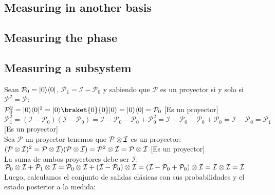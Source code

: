 \documentclass[osajnl,preprint,showpacs,superscriptaddress,10pt]{revtex4-1} %
\DeclarePairedDelimiter\bra{\langle}{\rvert}
\DeclarePairedDelimiter\ket{\lvert}{\rangle}
\begin{document}
\subsection{Measuring in another basis}

\subsection{Measuring the phase}

\subsection{Measuring a subsystem}

Sean $\mathcal{P}_0 = \ket{0}\bra{0}$, $\mathcal{P}_1 = \mathcal{I} - \mathcal{P}_0$ y sabiendo que $\mathcal{P}$ es un proyector si y solo si $\mathcal{P}^2 = \mathcal{P}$: \\

$\mathcal{P}^2_0 = \ket{0}\bra{0}^2 = \ket{0}\braket{0}{0}\ket{0} = \ket{0}\bra{0} = \mathcal{P}_0$ [Es un proyector] \\

$\mathcal{P}^2_1 = (\mathcal{I} - \mathcal{P}_0)(\mathcal{I} - \mathcal{P}_0) = \mathcal{I} - \mathcal{P}_0 - \mathcal{P}_0 + \mathcal{P}^2_0 = \mathcal{I} - \mathcal{P}_0 - \mathcal{P}_0 + \mathcal{P}_0 = \mathcal{I} - \mathcal{P}_0 = \mathcal{P}_1$ [Es un proyector] \\

Sea $\mathcal{P}$ un proyector tenemos que $\mathcal{P} \tens \mathcal{I}$ es un proyector: \\

$(\mathcal{P} \tens \mathcal{I})^2 = \mathcal{P} \tens \mathcal{I})(\mathcal{P} \tens \mathcal{I}) = \mathcal{P}^2 \tens \mathcal{I} = \mathcal{P} \tens \mathcal{I}$ [Es un proyector] \\

La suma de ambos proyectores debe ser $\mathcal{I}$: \\

$\mathcal{P}_0 \tens \mathcal{I} + \mathcal{P}_1 \tens \mathcal{I} = \mathcal{P}_0 \tens \mathcal{I} + (\mathcal{I} - \mathcal{P}_0) \tens \mathcal{I} = (\mathcal{I} - \mathcal{P}_0 + \mathcal{P}_0) \tens \mathcal{I} = \mathcal{I} \tens \mathcal{I} = \mathcal{I}$ \\

Luego, calculamos el conjunto de salidas clásicas con sus probabilidades y el estado posterior a la medida:
\end{document}
